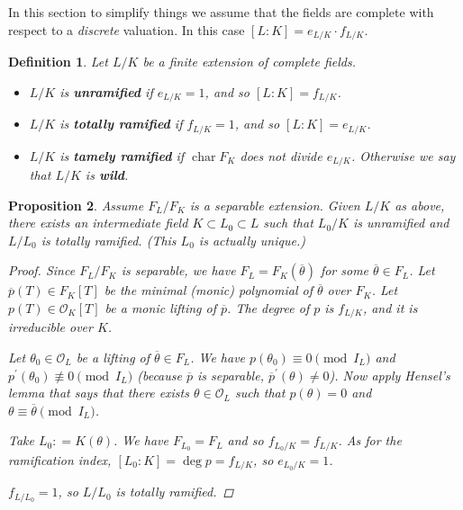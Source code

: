 \documentclass{article}
\newcommand{\term}{\textbf}
\newcommand{\dfn}{\mathrel{\mathop:}=}
\renewcommand{\O}{\mathcal{O}}
\DeclareMathOperator{\fchar}{char}
\theoremstyle{myplain}
\newtheorem{proposition}{Proposition}[section]
\theoremstyle{mydefinition}
\newtheorem{definition}[proposition]{Definition}
\begin{document}
In this section to simplify things we assume that the fields are complete with
respect to a \emph{discrete} valuation. In this case
$[L:K] = e_{L/K}\cdot f_{L/K}$.

\begin{definition}
  Let $L/K$ be a finite extension of complete fields.

  \begin{itemize}
  \item $L/K$ is \term{unramified} if $e_{L/K} = 1$, and so $[L:K] = f_{L/K}$.

  \item $L/K$ is \term{totally ramified} if $f_{L/K} = 1$, and so
    $[L:K] = e_{L/K}$.

  \item $L/K$ is \term{tamely ramified} if $\fchar F_K$ does not divide
    $e_{L/K}$. Otherwise we say that $L/K$ is \term{wild}.
  \end{itemize}
\end{definition}

\begin{proposition}
  Assume $F_L/F_K$ is a separable extension. Given $L/K$ as above, there exists
  an intermediate field $K \subset L_0 \subset L$ such that $L_0 / K$ is
  unramified and $L / L_0$ is totally ramified. (This $L_0$ is actually unique.)

  \begin{proof}
    Since $F_L/F_K$ is separable, we have $F_L = F_K (\overline{\theta})$ for
    some $\overline{\theta} \in F_L$. Let $\overline{p} (T) \in F_K [T]$ be the
    minimal (monic) polynomial of $\overline{\theta}$ over $F_K$. Let
    $p (T) \in \O_K [T]$ be a monic lifting of $\overline{p}$. The degree of $p$
    is $f_{L/K}$, and it is irreducible over $K$.

    Let $\theta_0 \in \O_L$ be a lifting of $\overline{\theta} \in F_L$. We have
    $p (\theta_0) \equiv 0 \pmod{I_L}$ and
    $p^\prime (\theta_0) \not\equiv 0 \pmod{I_L}$ (because $\overline{p}$ is
    separable, $\overline{p}^\prime (\theta) \ne 0$). Now apply Hensel's
    lemma that says that there exists $\theta \in \O_L$ such that
    $p (\theta) = 0$ and $\theta \equiv \overline{\theta} \pmod{I_L}$.

    Take $L_0 \dfn K (\theta)$. We have $F_{L_0} = F_L$ and so
    $f_{L_0/K} = f_{L/K}$. As for the ramification index,
    $[L_0 : K] = \deg p = f_{L/K}$, so $e_{L_0/K} = 1$.

    $f_{L/L_0} = 1$, so $L/L_0$ is totally ramified.
  \end{proof}
\end{proposition}
\end{document}
